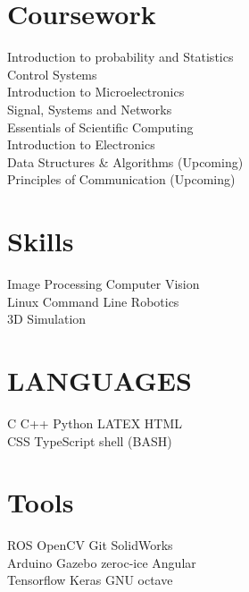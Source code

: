 \documentclass[]{deedy-resume-openfont}
\begin{document}
\begin{minipage}[t]{0.33\textwidth}

\section{Coursework}
Introduction to probability and Statistics \\
Control Systems \\
Introduction to Microelectronics \\
Signal, Systems and Networks \\
Essentials of Scientific Computing \\
Introduction to Electronics \\
Data Structures \& Algorithms (Upcoming) \\
Principles of Communication (Upcoming)
\sectionsep


\section{Skills}
Image Processing \textbullet{} Computer Vision \\
Linux Command Line \textbullet{} Robotics  \\ 
3D Simulation
\sectionsep

\section{LANGUAGES}
C \textbullet{}   C++ \textbullet{} Python \textbullet{} LATEX \textbullet{} HTML \\
CSS \textbullet{} TypeScript \textbullet{} shell (BASH)
\sectionsep

\section{Tools}
ROS \textbullet{} OpenCV \textbullet{} Git \textbullet{} SolidWorks \\ 
Arduino \textbullet{} Gazebo \textbullet{} zeroc-ice \textbullet{} Angular \\
Tensorflow \textbullet{} Keras \textbullet{} GNU octave
\sectionsep
%
%

\end{minipage} 
\hfill
\end{document}
